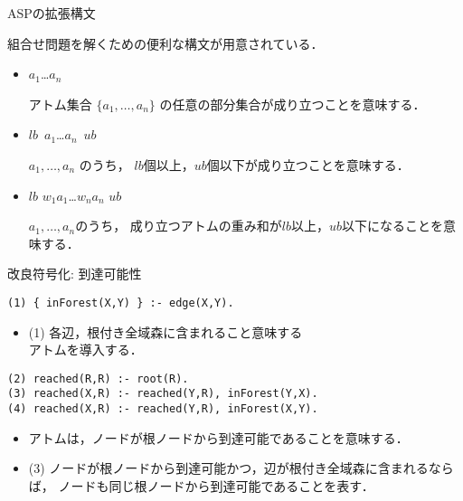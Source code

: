 \begin{frame}{ASPの拡張構文}
\begin{alertblock}{}\centering
  組合せ問題を解くための便利な構文が用意されている．
\end{alertblock}
\begin{itemize}
 \item {}
   \begin{center}
     \code{\{}$a_1$\code{;}\ldots\code{;}$a_n$\code{\}}
   \end{center}
   アトム集合 $\{a_1,\dots,a_n\}$
   の任意の部分集合が成り立つことを意味する．
 \item {}
   \begin{center}
     $lb$\ \code{\{}$a_1$\code{;}\ldots\code{;}$a_n$\code{\}}\ $ub$
   \end{center}
   $a_1,\dots,a_n$ のうち，
   $lb$個以上，$ub$個以下が成り立つことを意味する．
 \item {}
   \begin{center}
     $lb$  $w_1$\code{:}$a_1$\code{;}\ldots\code{;}$w_n$\code{:}$a_n$ \code{\}} $ub$
   \end{center}
   $a_1,\dots,a_n$のうち，
   成り立つアトムの重み和が$lb$以上，$ub$以下になることを意味する．
\end{itemize}
\end{frame}
\begin{frame}[fragile]{改良符号化: 到達可能性}
\begin{exampleblock}{}\small
\begin{lstlisting}
(1) { inForest(X,Y) } :- edge(X,Y).
\end{lstlisting}
\end{exampleblock}
\begin{itemize}
 \item (1) 各辺，根付き全域森に含まれること意味する \\
	  アトムを導入する．
\end{itemize}
\begin{exampleblock}{}\small
\begin{lstlisting}
(2) reached(R,R) :- root(R).
(3) reached(X,R) :- reached(Y,R), inForest(Y,X).
(4) reached(X,R) :- reached(Y,R), inForest(X,Y).
\end{lstlisting}
\end{exampleblock}
\vfill
\begin{itemize}
\item アトムは，ノードが根ノードから到達可能であることを意味する．
\item (3) ノードが根ノードから到達可能かつ，辺が根付き全域森に含まれるならば，
	  ノードも同じ根ノードから到達可能であることを表す．
\end{itemize}
\end{frame}
